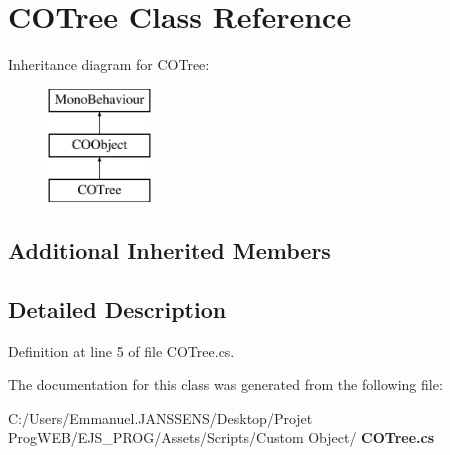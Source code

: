 \section{C\+O\+Tree Class Reference}
\label{class_c_o_tree}
Inheritance diagram for C\+O\+Tree\+:\begin{figure}[H]
\begin{center}
\leavevmode
\includegraphics[height=3.000000cm]{class_c_o_tree}
\end{center}
\end{figure}
\subsection*{Additional Inherited Members}


\subsection{Detailed Description}


Definition at line 5 of file C\+O\+Tree.\+cs.



The documentation for this class was generated from the following file\+:\begin{DoxyCompactItemize}
\item 
C\+:/\+Users/\+Emmanuel.\+J\+A\+N\+S\+S\+E\+N\+S/\+Desktop/\+Projet Prog\+W\+E\+B/\+E\+J\+S\+\_\+\+P\+R\+O\+G/\+Assets/\+Scripts/\+Custom Object/\textbf{ C\+O\+Tree.\+cs}\end{DoxyCompactItemize}
